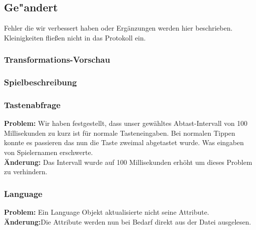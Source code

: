 %



\subsection{Ge{"a}ndert}
\label{Abschnitt:Aenderungen:Protokoll:Behobene_Probleme}

Fehler die wir verbessert haben oder Ergänzungen werden hier beschrieben. Kleinigkeiten fließen nicht in das Protokoll ein.\\











\subsubsection*{Transformations-Vorschau}








\subsubsection*{Spielbeschreibung}











\subsubsection*{Tastenabfrage}
\textbf{Problem:}
Wir haben festgestellt, dass unser gewähltes Abtast-Intervall von 100 Millisekunden zu kurz ist für normale Tasteneingaben. Bei normalen Tippen konnte es passieren das nun die Taste zweimal abgetastet wurde. Was eingaben von Spielernamen erschwerte. \\
\textbf{Änderung:} Das Intervall wurde auf 100 Millisekunden erhöht um dieses Problem zu verhindern.

\subsubsection*{Language}
\textbf{Problem:}
Ein Language Objekt aktualisierte nicht seine Attribute.
\\
\textbf{Änderung:}Die Attribute werden nun bei Bedarf direkt aus der Datei ausgelesen.


